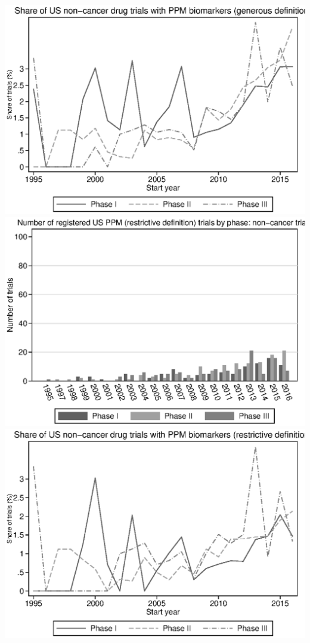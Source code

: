 \includegraphics{../figures/A06b-g_ppm_share_by_phase_noncancer_us.eps}
\includegraphics{../figures/A06c-r_ppm_count_by_phase_noncancer_us.eps}
\includegraphics{../figures/A06d-r_ppm_share_by_phase_noncancer_us.eps}
